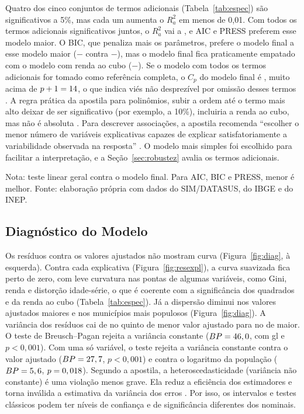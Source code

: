 \documentclass[a4paper,11pt]{article}
\newcommand{\fonte}{Fonte: elaboração própria com dados do SIM/DATASUS, do IBGE e do INEP.}
\newcommand{\nota}[2][\fonte]{\par\vspace{2pt}\begin{minipage}{\linewidth}\footnotesize Nota: #2 #1\end{minipage}}
\begin{document}
Quatro dos cinco conjuntos de termos adicionais (Tabela~\ref{tab:espec}) são significativos a 5\%, mas cada um aumenta o $R^2_a$ em menos de 0,01. Com todos os termos adicionais significativos juntos, o $R^2_a$ vai a \nRdoisATodos, e AIC e PRESS preferem esse modelo maior. O BIC, que penaliza mais os parâmetros, prefere o modelo final a esse modelo maior ($-$\nBICfinal{} contra $-$\nBICtodos), mas o modelo final fica praticamente empatado com o modelo com renda ao cubo ($-$\nBICcubo). Se o modelo com todos os termos adicionais for tomado como referência completa, o $C_p$ do modelo final é \nCpFinal, muito acima de $p+1 = 14$, o que indica viés não desprezível por omissão desses termos \citep[cap.~8]{ferrari2023}. A regra prática da apostila para polinômios, subir a ordem até o termo mais alto deixar de ser significativo (por exemplo, a 10\%), incluiria a renda ao cubo, mas não é absoluta \citep[cap.~7]{ferrari2023}. Para descrever associações, a apostila recomenda ``escolher o menor número de variáveis explicativas capazes de explicar satisfatoriamente a variabilidade observada na resposta'' \citep[cap.~8]{ferrari2023}. O modelo mais simples foi escolhido para facilitar a interpretação, e a Seção~\ref{sec:robustez} avalia os termos adicionais.

\begin{table}[!htb]
\centering
\caption{Termos adicionais somados ao modelo final}
\label{tab:espec}
\small
\setlength{\tabcolsep}{4pt}
%
\nota{teste linear geral contra o modelo final. Para AIC, BIC e PRESS, menor é melhor.}
\end{table}

\subsection{Diagnóstico do Modelo}
\label{sec:diag}

Os resíduos contra os valores ajustados não mostram curva (Figura~\ref{fig:diag}, à esquerda). Contra cada explicativa (Figura~\ref{fig:resexpl}), a curva suavizada fica perto de zero, com leve curvatura nas pontas de algumas variáveis, como Gini, renda e distorção idade-série, o que é coerente com a significância dos quadrados e da renda ao cubo (Tabela~\ref{tab:espec}). Já a dispersão diminui nos valores ajustados maiores e nos municípios mais populosos (Figura~\ref{fig:diag}). A variância dos resíduos cai de \nVarAjMenor{} no quinto de menor valor ajustado para \nVarAjMaior{} no de maior. O teste de Breusch--Pagan rejeita a variância constante ($BP = 46,0$, com \nBPgl{} gl e $p < 0{,}001$). Com uma só variável, o teste rejeita a variância constante contra o valor ajustado ($BP = 27,7$, $p < 0{,}001$) e contra o logaritmo da população ($BP = 5,6$, $p = 0,018$). Segundo a apostila, a heteroscedasticidade (variância não constante) é uma violação menos grave. Ela reduz a eficiência dos estimadores e torna inválida a estimativa da variância dos erros \citep[cap.~4]{ferrari2023}. Por isso, os intervalos e testes clássicos podem ter níveis de confiança e de significância diferentes dos nominais.
\end{document}
